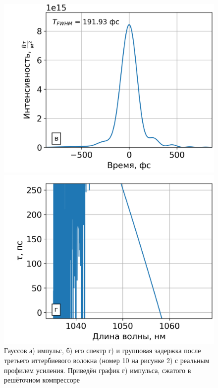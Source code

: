 \documentclass[12pt]{article}
\begin{document}
\begin{figure}[h!]
  \begin{minipage}[b]{0.5\textwidth}
    \includegraphics[width=\linewidth]{Images/Gauss Pulse without 15-19/23 элемент gamma=50.14203 l_g=0.39316 сжатие}
  \end{minipage}%
  \begin{minipage}[b]{0.5\textwidth}
    \includegraphics[width=\linewidth]{Images/Gauss Pulse without 15-19/!23. Fiber_time_delay}
  \end{minipage}

  \caption{Гауссов а) импульс, б) его спектр г) и групповая задержка после третьего иттербиевого волокна (номер 10 на
  рисунке 2) с реальным профилем усиления. Приведён график г) импульса, сжатого в решёточном компрессоре}
  \label{fig:both}
\end{figure}
\end{document}
